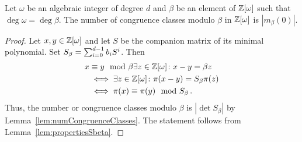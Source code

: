 \begin{thm}
Let $\omega$ be an algebraic integer of degree $d$ and  $\beta$ be an element of $\mathbb{Z}[\omega]$ such that $\deg \omega = \deg\beta$. The number of congruence classes modulo $\beta$ in $\mathbb{Z}[\omega]$ is $|m_\beta(0)|$.
\label{thm:numbCongruenceClasses}
\end{thm}
\begin{proof}
Let $x, y\in\mathbb{Z}[\omega]$ and let $S$ be the companion matrix of its minimal polynomial. Set $S_\beta=\sum_{i=0}^{d-1} {b}_i S^i$. Then
\begin{align*}
x&\equiv y \mod \beta \exists z \in \mathbb{Z}[\omega] \colon x-y= \beta z \\
&\iff \exists z \in \mathbb{Z}[\omega] \colon \pi(x-y)= S_\beta \pi(z) \\
&\iff \pi(x) \equiv \pi(y) \mod S_\beta\,.
\end{align*}
Thus, the number or congruence classes modulo $\beta$ is $|\det S_\beta|$ by Lemma~\ref{lem:numCongruenceClasses}. The statement follows from Lemma~\ref{lem:propertiesSbeta}. 
\end{proof}